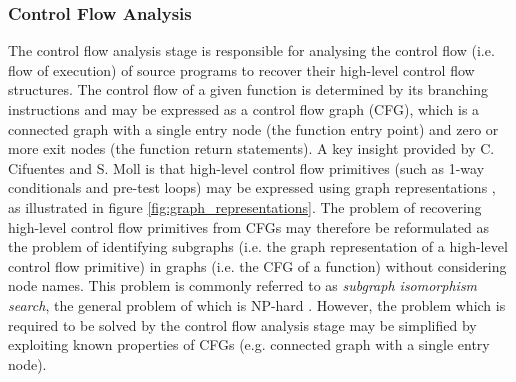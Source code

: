 
\subsubsection{Control Flow Analysis}
\label{sec:lit_review_control_flow_analysis}

The control flow analysis stage is responsible for analysing the control flow (i.e. flow of execution) of source programs to recover their high-level control flow structures. The control flow of a given function is determined by its branching instructions and may be expressed as a control flow graph (CFG), which is a connected graph with a single entry node (the function entry point) and zero or more exit nodes (the function return statements). A key insight provided by C. Cifuentes and S. Moll is that high-level control flow primitives (such as 1-way conditionals and pre-test loops) may be expressed using graph representations \cite{reverse_comp, decomp_of_llvm}, as illustrated in figure \ref{fig:graph_representations}. The problem of recovering high-level control flow primitives from CFGs may therefore be reformulated as the problem of identifying subgraphs (i.e. the graph representation of a high-level control flow primitive) in graphs (i.e. the CFG of a function) without considering node names. This problem is commonly referred to as \textit{subgraph isomorphism search}, the general problem of which is NP-hard \cite{subgraph_isomorphism_algorithms}. However, the problem which is required to be solved by the control flow analysis stage may be simplified by exploiting known properties of CFGs (e.g. connected graph with a single entry node).

